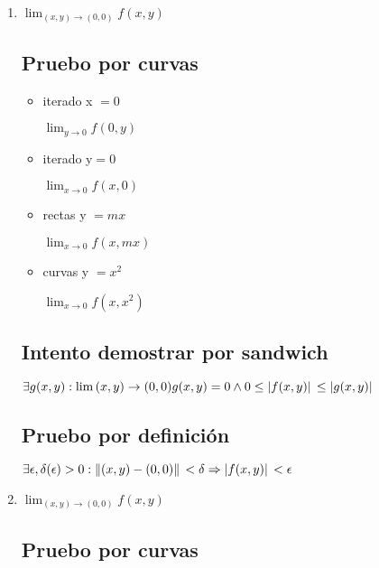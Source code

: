 \documentclass[../parcial.tex]{subfiles}
\begin{document}
    \begin{enumerate}
        \item $ \lim_{(x,y) \to (0,0)} f(x,y) $

        \subsection*{Pruebo por curvas}

        \begin{itemize}
            \item iterado x $= 0$

                $\lim_{y\to0} f(0,y)$

            \item iterado y$= 0$

                $\lim_{x\to0} f(x,0)$

            \item rectas y $= mx$
            
                $\lim_{x\to0} f(x,mx)$

            \item curvas y $= x^2$

                $\lim_{x\to0} f(x,x^2)$

        \end{itemize}

            \subsection*{Intento demostrar por sandwich}
        
            $ \exists g(x,y): \lim{(x,y)\to(0,0)} g(x,y) = 0 \wedge 0 \leq \abs*{f(x,y)} \leq \abs*{g(x,y)} $
        
            \subsection*{Pruebo por definición}

            $ \exists \epsilon,\delta(\epsilon) > 0 : \norm*{(x,y) - (0,0)} < \delta \Rightarrow \abs*{f(x,y)} < \epsilon $


        \item $ \lim_{(x,y) \to (0,0)} f(x,y) $
        
            \subsection*{Pruebo por curvas}


\end{enumerate}
\end{document}

